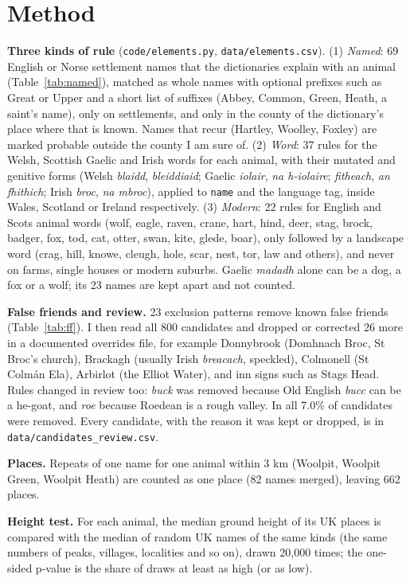 \documentclass[11pt,a4paper]{article}
\begin{document}
\section{Method}
\textbf{Three kinds of rule} (\texttt{code/elements.py}, \texttt{data/elements.csv}). (1) \textit{Named}: 69 English or Norse settlement names that the dictionaries explain with an animal (Table~\ref{tab:named}), matched as whole names with optional prefixes such as Great or Upper and a short list of suffixes (Abbey, Common, Green, Heath, a saint's name), only on settlements, and only in the county of the dictionary's place where that is known. Names that recur (Hartley, Woolley, Foxley) are marked probable outside the county I am sure of. (2) \textit{Word}: 37 rules for the Welsh, Scottish Gaelic and Irish words for each animal, with their mutated and genitive forms (Welsh \textit{blaidd}, \textit{bleiddiaid}; Gaelic \textit{iolair}, \textit{na h-iolaire}; \textit{fitheach}, \textit{an fhithich}; Irish \textit{broc}, \textit{na mbroc}), applied to \texttt{name} and the language tag, inside Wales, Scotland or Ireland respectively. (3) \textit{Modern}: 22 rules for English and Scots animal words (wolf, eagle, raven, crane, hart, hind, deer, stag, brock, badger, fox, tod, cat, otter, swan, kite, glede, boar), only followed by a landscape word (crag, hill, knowe, cleugh, hole, scar, nest, tor, law and others), and never on farms, single houses or modern suburbs. Gaelic \textit{madadh} alone can be a dog, a fox or a wolf; its 23 names are kept apart and not counted.

\textbf{False friends and review.} 23 exclusion patterns remove known false friends (Table~\ref{tab:ff}). I then read all 800 candidates and dropped or corrected 26 more in a documented overrides file, for example Donnybrook (Domhnach Broc, St Broc's church), Brackagh (usually Irish \textit{breacach}, speckled), Colmonell (St Colm\'an Ela), Arbirlot (the Elliot Water), and inn signs such as Stags Head. Rules changed in review too: \textit{buck} was removed because Old English \textit{bucc} can be a he-goat, and \textit{roe} because Roedean is a rough valley. In all 7.0\% of candidates were removed. Every candidate, with the reason it was kept or dropped, is in \texttt{data/candidates\_review.csv}.

\textbf{Places.} Repeats of one name for one animal within 3 km (Woolpit, Woolpit Green, Woolpit Heath) are counted as one place (82 names merged), leaving 662 places.

\textbf{Height test.} For each animal, the median ground height of its UK places is compared with the median of random UK names of the same kinds (the same numbers of peaks, villages, localities and so on), drawn 20,000 times; the one-sided p-value is the share of draws at least as high (or as low).
\end{document}
